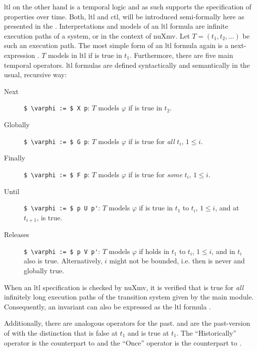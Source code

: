 \gls{ltl} on the other hand is a temporal logic and as such supports the specification of properties over time.
Both, \gls{ltl} and \gls{ctl}, will be introduced semi-formally here as presented in the  \cite{nuXmv}.
Interpretations and models of an \gls{ltl} formula are infinite execution paths of a system, or in the context of nuXmv.
Let $ T = (t_1, t_2, \dots) $ be such an execution path.
The most simple form of an \gls{ltl} formula again is a next-expression .
$ T $ models  in \gls{ltl} if  is true in $ t_1 $.
Furthermore, there are five main temporal operators.
\gls{ltl} formulas are defined syntactically and semantically in the usual, recursive way:
\begin{description}
    \item[Next] \lstinline[language=smv,mathescape=true]{$ \varphi := $ X p}: $ T $ models $ \varphi $ if  is true in $ t_2 $.
    \item[Globally] \lstinline[language=smv,mathescape=true]{$ \varphi := $ G p}: $ T $ models $ \varphi $ if  is true for \textit{all} $ t_i $, $ 1 \leq i $.
    \item[Finally] \lstinline[language=smv,mathescape=true]{$ \varphi := $ F p}: $ T $ models $ \varphi $ if  is true for \textit{some} $ t_i $, $ 1 \leq i $.
    \item[Until] \lstinline[language=smv,mathescape=true]{$ \varphi := $ p U p'}: $ T $ models $ \varphi $ if  is true in $ t_1 $ to $ t_i $, $ 1 \leq i $, and at $ t_{i + 1} $,  is true.
    \item[Releases] \lstinline[language=smv,mathescape=true]{$ \varphi := $ p V p'}: $ T $ models $ \varphi $ if  holds in $ t_1 $ to $ t_i $, $ 1 \leq i $, and in $ t_i $ also  is true.
    Alternatively, $ i $ might not be bounded, i.e.  then is never and  globally true.
\end{description}

When an \gls{ltl} specification  is checked by nuXmv, it is verified that  is true for \textit{all} infinitely long execution paths of the transition system given by the main module.
Consequently, an invariant  can also be expressed as the \gls{ltl} formula .

Additionally, there are analogous operators for the past.
 and  are the past-version of  with the distinction that  is false at $ t_1 $ and  is true at $ t_1 $.
The \enquote{Historically} operator  is the counterpart to  and the \enquote{Once} operator  is the counterpart to .


